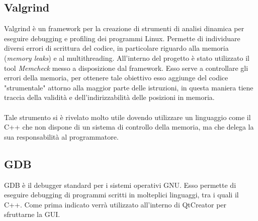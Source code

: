 {\subsection{Valgrind}
Valgrind è un framework per la creazione di strumenti di analisi dinamica per eseguire debugging e profiling dei programmi Linux. Permette di individuare diversi errori di scrittura del codice, in particolare riguardo alla memoria (\textit{memory leaks}) e al multithreading. All'interno del progetto è stato utilizzato il tool \textit{Memcheck} messo a disposizione dal framework. Esso serve a controllare gli errori della memoria, per ottenere tale obiettivo esso  aggiunge del codice "strumentale" attorno alla maggior parte delle istruzioni, in questa maniera tiene traccia della validità e dell'indirizzabilità delle posizioni in memoria.\\\\ Tale strumento si è rivelato molto utile dovendo utilizzare un linguaggio come il C++ che non dispone di un sistema di controllo della memoria, ma che delega la sua responsabilità al programmatore.

\subsection{GDB}
GDB è il debugger standard per i sistemi operativi GNU. Esso permette di eseguire debugging di programmi scritti in molteplici linguaggi, tra i quali il C++. Come prima indicato verrà utilizzato all'interno di QtCreator per sfruttarne la GUI.

}
